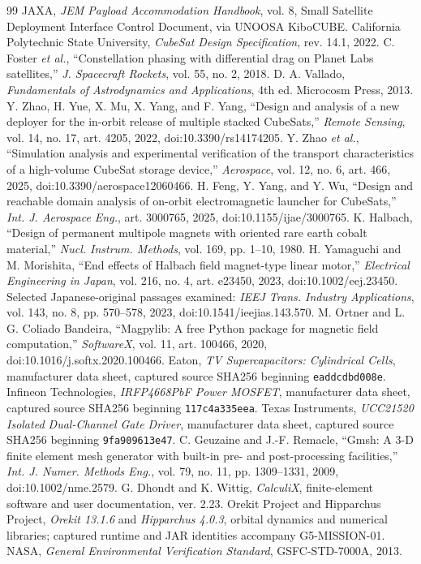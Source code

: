\documentclass[conference,a4paper]{IEEEtran}
\begin{document}
\begin{thebibliography}{99}
 JAXA, \emph{JEM Payload Accommodation Handbook}, vol. 8, Small Satellite Deployment Interface Control Document, via UNOOSA KiboCUBE.
 California Polytechnic State University, \emph{CubeSat Design Specification}, rev. 14.1, 2022.
 C. Foster \emph{et al.}, ``Constellation phasing with differential drag on Planet Labs satellites,'' \emph{J. Spacecraft Rockets}, vol. 55, no. 2, 2018.
 D. A. Vallado, \emph{Fundamentals of Astrodynamics and Applications}, 4th ed. Microcosm Press, 2013.
 Y. Zhao, H. Yue, X. Mu, X. Yang, and F. Yang, ``Design and analysis of a new deployer for the in-orbit release of multiple stacked CubeSats,'' \emph{Remote Sensing}, vol. 14, no. 17, art. 4205, 2022, doi:10.3390/rs14174205.
 Y. Zhao \emph{et al.}, ``Simulation analysis and experimental verification of the transport characteristics of a high-volume CubeSat storage device,'' \emph{Aerospace}, vol. 12, no. 6, art. 466, 2025, doi:10.3390/aerospace12060466.
 H. Feng, Y. Yang, and Y. Wu, ``Design and reachable domain analysis of on-orbit electromagnetic launcher for CubeSats,'' \emph{Int. J. Aerospace Eng.}, art. 3000765, 2025, doi:10.1155/ijae/3000765.
 K. Halbach, ``Design of permanent multipole magnets with oriented rare earth cobalt material,'' \emph{Nucl. Instrum. Methods}, vol. 169, pp. 1--10, 1980.
 H. Yamaguchi and M. Morishita, ``End effects of Halbach field magnet-type linear motor,'' \emph{Electrical Engineering in Japan}, vol. 216, no. 4, art. e23450, 2023, doi:10.1002/eej.23450. Selected Japanese-original passages examined: \emph{IEEJ Trans. Industry Applications}, vol. 143, no. 8, pp. 570--578, 2023, doi:10.1541/ieejias.143.570.
 M. Ortner and L. G. Coliado Bandeira, ``Magpylib: A free Python package for magnetic field computation,'' \emph{SoftwareX}, vol. 11, art. 100466, 2020, doi:10.1016/j.softx.2020.100466.
 Eaton, \emph{TV Supercapacitors: Cylindrical Cells}, manufacturer data sheet, captured source SHA256 beginning \texttt{eaddcdbd008e}.
 Infineon Technologies, \emph{IRFP4668PbF Power MOSFET}, manufacturer data sheet, captured source SHA256 beginning \texttt{117c4a335eea}.
 Texas Instruments, \emph{UCC21520 Isolated Dual-Channel Gate Driver}, manufacturer data sheet, captured source SHA256 beginning \texttt{9fa909613e47}.
 C. Geuzaine and J.-F. Remacle, ``Gmsh: A 3-D finite element mesh generator with built-in pre- and post-processing facilities,'' \emph{Int. J. Numer. Methods Eng.}, vol. 79, no. 11, pp. 1309--1331, 2009, doi:10.1002/nme.2579.
 G. Dhondt and K. Wittig, \emph{CalculiX}, finite-element software and user documentation, ver. 2.23.
 Orekit Project and Hipparchus Project, \emph{Orekit 13.1.6} and \emph{Hipparchus 4.0.3}, orbital dynamics and numerical libraries; captured runtime and JAR identities accompany G5-MISSION-01.
 NASA, \emph{General Environmental Verification Standard}, GSFC-STD-7000A, 2013.
\end{thebibliography}
\end{document}
